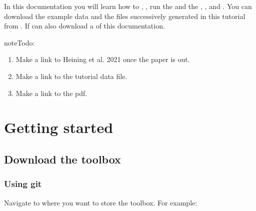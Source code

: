 \documentclass[letterpaper,10pt,english]{sphinxmanual}
\begin{document}
In this documentation you will learn how to {\hyperref[\detokenize{getting_started:getting-started}]{}}, {\hyperref[\detokenize{setting_parameters:setting-parameters}]{}},
run the {\hyperref[\detokenize{preprocessing:preprocessing}]{}} and the {\hyperref[\detokenize{LFP_to_bursts:lfp-to-bursts}]{}}, {\hyperref[\detokenize{access_results:access-results}]{}},
and {\hyperref[\detokenize{access_metadata:access-metadata}]{}}.
You can download the example data and the files successively generated in this tutorial from .
If can also download a  of this documentation.

\begin{sphinxadmonition}{note}{\label{index:index-0}Todo:}\begin{enumerate}
\def\theenumi{\arabic{enumi}}
\def\labelenumi{\theenumi )}
\makeatletter\def\p@enumii{\p@enumi \theenumi )}\makeatother
\item {} 
Make a link to Heining et al. 2021 once the paper is out.

\item {} 
Make a link to the tutorial data file.

\item {} 
Make a link to the pdf.

\end{enumerate}
\end{sphinxadmonition}


\chapter{Getting started}
\label{\detokenize{getting_started:getting-started}}\label{\detokenize{getting_started:id1}}\label{\detokenize{getting_started::doc}}

\section{Download the toolbox}
\label{\detokenize{getting_started:download-the-toolbox}}\label{\detokenize{getting_started:download}}

\subsection{Using git}
\label{\detokenize{getting_started:using-git}}\label{\detokenize{getting_started:download-git}}
Navigate to where you want to store the toolbox. For example:
\end{document}
